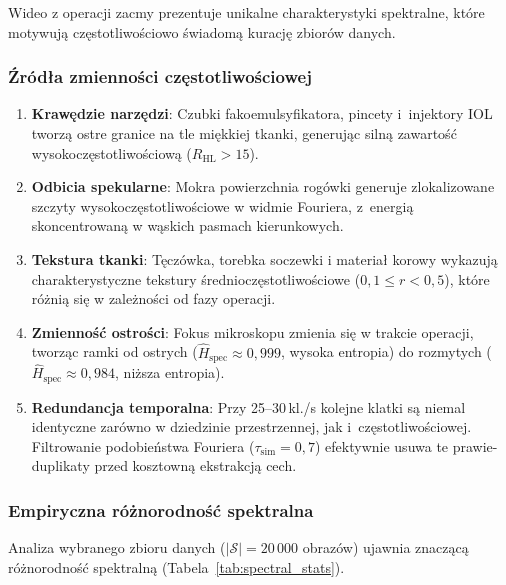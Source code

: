 Wideo z operacji zacmy prezentuje unikalne charakterystyki spektralne, które
motywują częstotliwościowo świadomą kurację zbiorów danych.

\subsubsection{Źródła zmienności częstotliwościowej}

\begin{enumerate}
    \item \textbf{Krawędzie narzędzi}: Czubki fakoemulsyfikatora, pincety
          i~injektory IOL tworzą ostre granice na tle miękkiej tkanki,
          generując silną zawartość wysokoczęstotliwościową
          ($R_{\text{HL}} > 15$).

    \item \textbf{Odbicia spekularne}: Mokra powierzchnia rogówki generuje
          zlokalizowane szczyty wysokoczęstotliwościowe w widmie Fouriera,
          z~energią skoncentrowaną w wąskich pasmach kierunkowych.

    \item \textbf{Tekstura tkanki}: Tęczówka, torebka soczewki i materiał
          korowy wykazują charakterystyczne tekstury średnioczęstotliwościowe
          ($0{,}1 \leq r < 0{,}5$), które różnią się w zależności od fazy
          operacji.

    \item \textbf{Zmienność ostrości}: Fokus mikroskopu zmienia się w trakcie
          operacji, tworząc ramki od ostrych
          ($\hat{H}_{\text{spec}} \approx 0{,}999$, wysoka entropia) do
          rozmytych ($\hat{H}_{\text{spec}} \approx 0{,}984$, niższa
          entropia).

    \item \textbf{Redundancja temporalna}: Przy 25--30\,kl./s kolejne klatki
          są niemal identyczne zarówno w dziedzinie przestrzennej, jak
          i~częstotliwościowej.  Filtrowanie podobieństwa Fouriera
          ($\tau_{\text{sim}} = 0{,}7$) efektywnie usuwa te
          prawie-duplikaty przed kosztowną ekstrakcją cech.
\end{enumerate}

\subsubsection{Empiryczna różnorodność spektralna}

Analiza wybranego zbioru danych ($|\mathcal{S}| = 20\,000$ obrazów) ujawnia
znaczącą różnorodność spektralną (Tabela~\ref{tab:spectral_stats}).


